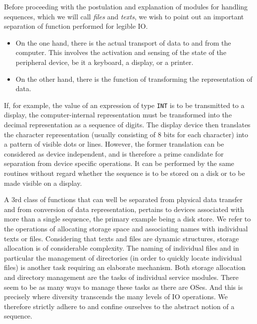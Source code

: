Before proceeding with the postulation and explanation of modules for handling sequences,
which we will call \emph{files} and \emph{texts}, we wish to point out an important
separation of function performed for legible IO.
\begin{itemize}
  \item[] On the one hand, there is the actual transport of data to and from the computer.
    This involves the activation and sensing of the state of the peripheral device, be it
    a keyboard, a display, or a printer.
  \item[] On the other hand, there is the function of transforming the representation of
    data.
\end{itemize}
If, for example, the value of an expression of type \verb|INT| is to be transmitted to a
display, the computer-internal representation must be transformed into the decimal
representation as a sequence of digits. The display device then translates the character
representation (usually consisting of 8 bits for each character) into a pattern of visible
dots or lines. However, the former translation can be considered as device independent,
and is therefore a prime candidate for separation from device specific operations. It can
be performed by the same routines without regard whether the sequence is to be stored on
a disk or to be made visible on a display.

A 3rd class of functions that can well be separated from physical data transfer and from
conversion of data representation, pertains to devices associated with more than a single
sequence, the primary example being a disk store. We refer to the operations of allocating
storage space and associating names with individual texts or files. Considering that texts
and files are dynamic structures, storage allocation is of considerable complexity. The
naming of individual files and in particular the management of directories (in order to
quickly locate individual files) is another task requiring an elaborate mechanism. Both
storage allocation and directory management are the tasks of individual service modules.
There seem to be as many ways to manage these tasks as there are OSes. And this is precisely
where diversity transcends the many levels of IO operations. We therefore strictly adhere
to and confine ourselves to the abstract notion of a sequence.

